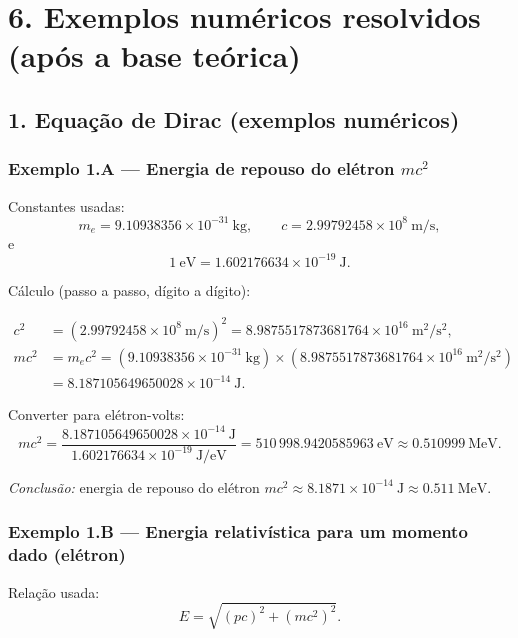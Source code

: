 \documentclass[12pt,a4paper]{article}
\begin{document}
\newpage
\section*{6. Exemplos numéricos resolvidos (após a base teórica)}

\subsection*{1. Equação de Dirac (exemplos numéricos)}

\subsubsection*{Exemplo 1.A — Energia de repouso do elétron \(mc^2\)}

Constantes usadas:
\[
m_e = 9.10938356\times 10^{-31}\ \mathrm{kg},\qquad
c = 2.99792458\times 10^8\ \mathrm{m/s},
\]
e
\[
1\ \mathrm{eV} = 1.602176634\times 10^{-19}\ \mathrm{J}.
\]

Cálculo (passo a passo, dígito a dígito):

\begin{align*}
c^2 &= (2.99792458\times 10^{8}\ \mathrm{m/s})^2
= 8.9875517873681764\times 10^{16}\ \mathrm{m^2/s^2}, \\[6pt]
mc^2 &= m_e c^2
= (9.10938356\times 10^{-31}\ \mathrm{kg}) \times (8.9875517873681764\times 10^{16}\ \mathrm{m^2/s^2}) \\
&= 8.187105649650028\times 10^{-14}\ \mathrm{J}.
\end{align*}

Converter para elétron-volts:
\[
mc^2 = \frac{8.187105649650028\times 10^{-14}\ \mathrm{J}}{1.602176634\times 10^{-19}\ \mathrm{J/eV}}
= 510\,998.9420585963\ \mathrm{eV} \approx 0.510999\ \mathrm{MeV}.
\]

\emph{Conclusão:} energia de repouso do elétron \(mc^2 \approx 8.1871\times10^{-14}\ \mathrm{J}\approx 0.511\ \mathrm{MeV}.\)

\subsubsection*{Exemplo 1.B — Energia relativística para um momento dado (elétron)}

Relação usada:
\[
E = \sqrt{(pc)^2 + (mc^2)^2}.
\]
\end{document}
